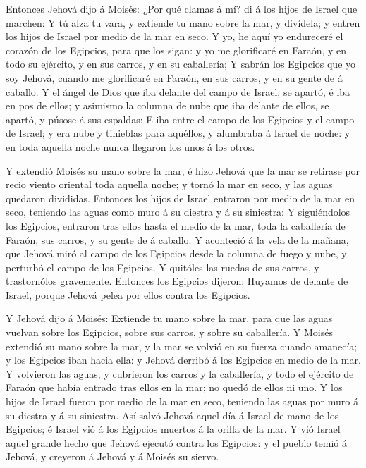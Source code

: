  Entonces Jehová dijo á Moisés: ¿Por qué clamas á mí? di á
los hijos de Israel que marchen:  Y tú alza tu vara, y
extiende tu mano sobre la mar, y divídela; y entren los hijos de Israel
por medio de la mar en seco.  Y yo, he aquí yo endureceré
el corazón de los Egipcios, para que los sigan: y yo me glorificaré en
Faraón, y en todo su ejército, y en sus carros, y en su caballería;
 Y sabrán los Egipcios que yo soy Jehová, cuando me
glorificaré en Faraón, en sus carros, y en su gente de á caballo.
 Y el ángel de Dios que iba delante del campo de Israel, se
apartó, é iba en pos de ellos; y asimismo la columna de nube que iba
delante de ellos, se apartó, y púsose á sus espaldas:  E
iba entre el campo de los Egipcios y el campo de Israel; y era nube y
tinieblas para aquéllos, y alumbraba á Israel de noche: y en toda
aquella noche nunca llegaron los unos á los otros.

 Y extendió Moisés su mano sobre la mar, é hizo Jehová que
la mar se retirase por recio viento oriental toda aquella noche; y tornó
la mar en seco, y las aguas quedaron divididas.  Entonces
los hijos de Israel entraron por medio de la mar en seco, teniendo las
aguas como muro á su diestra y á su siniestra:  Y
siguiéndolos los Egipcios, entraron tras ellos hasta el medio de la mar,
toda la caballería de Faraón, sus carros, y su gente de á caballo.
 Y aconteció á la vela de la mañana, que Jehová miró al
campo de los Egipcios desde la columna de fuego y nube, y perturbó el
campo de los Egipcios.  Y quitóles las ruedas de sus
carros, y trastornólos gravemente. Entonces los Egipcios dijeron:
Huyamos de delante de Israel, porque Jehová pelea por ellos contra los
Egipcios.

 Y Jehová dijo á Moisés: Extiende tu mano sobre la mar,
para que las aguas vuelvan sobre los Egipcios, sobre sus carros, y sobre
su caballería.  Y Moisés extendió su mano sobre la mar, y
la mar se volvió en su fuerza cuando amanecía; y los Egipcios iban hacia
ella: y Jehová derribó á los Egipcios en medio de la mar. 
Y volvieron las aguas, y cubrieron los carros y la caballería, y todo el
ejército de Faraón que había entrado tras ellos en la mar; no quedó de
ellos ni uno.  Y los hijos de Israel fueron por medio de la
mar en seco, teniendo las aguas por muro á su diestra y á su siniestra.
 Así salvó Jehová aquel día á Israel de mano de los
Egipcios; é Israel vió á los Egipcios muertos á la orilla de la mar.
 Y vió Israel aquel grande hecho que Jehová ejecutó contra
los Egipcios: y el pueblo temió á Jehová, y creyeron á Jehová y á Moisés
su siervo.


